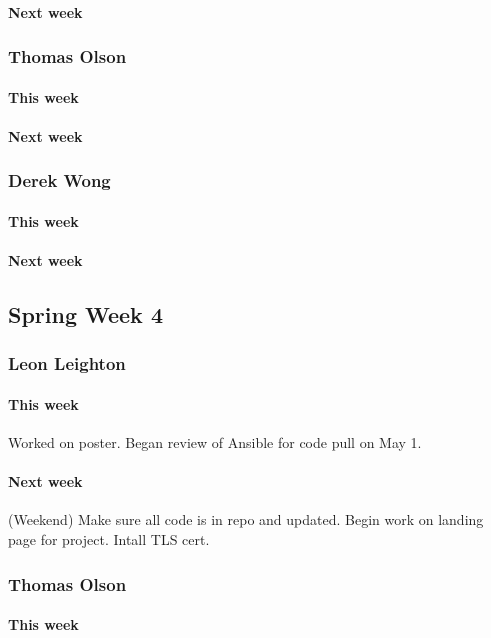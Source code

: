 \documentclass[10pt,letterpaper,onecolumn,draftclsnofoot]{IEEEtran}
\begin{document}
\paragraph{Next week}

\subsubsection{Thomas Olson}
\paragraph{This week}
\paragraph{Next week}

\subsubsection{Derek Wong}
\paragraph{This week}
\paragraph{Next week}


\subsection{Spring Week 4}
\subsubsection{Leon Leighton}
\paragraph{This week}Worked on poster.  
Began review of Ansible for code pull on May 1.
\paragraph{Next week}(Weekend) Make sure all code is in repo and updated.  
Begin work on landing page for project.  
Intall TLS cert.


\subsubsection{Thomas Olson}
\paragraph{This week}
\end{document}
